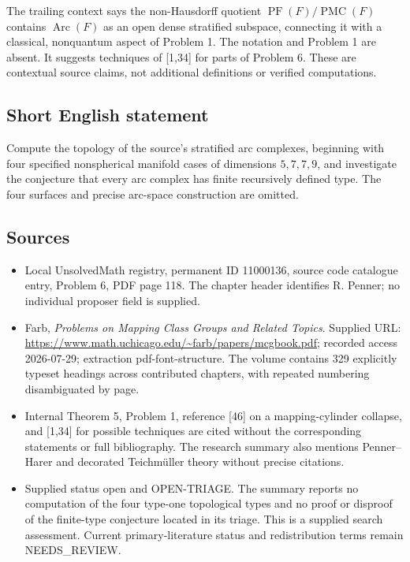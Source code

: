 \documentclass[11pt]{article}
\begin{document}
The trailing context says the non-Hausdorff quotient \(\operatorname{PF}(F)/\operatorname{PMC}(F)\) contains \(\operatorname{Arc}(F)\) as an open dense stratified subspace, connecting it with a classical, nonquantum aspect of Problem 1. The notation and Problem 1 are absent. It suggests techniques of [1,34] for parts of Problem 6. These are contextual source claims, not additional definitions or verified computations.
\subsection{Short English statement}
Compute the topology of the source's stratified arc complexes, beginning with four specified nonspherical manifold cases of dimensions \(5,7,7,9\), and investigate the conjecture that every arc complex has finite recursively defined type. The four surfaces and precise arc-space construction are omitted.
\subsection{Sources}
\begin{itemize}
\item Local UnsolvedMath registry, permanent ID 11000136, source code catalogue entry, Problem 6, PDF page 118. The chapter header identifies R. Penner; no individual proposer field is supplied.
\item Farb, \emph{Problems on Mapping Class Groups and Related Topics}. Supplied URL: \url{https://www.math.uchicago.edu/~farb/papers/mcgbook.pdf}; recorded access 2026-07-29; extraction pdf-font-structure. The volume contains 329 explicitly typeset headings across contributed chapters, with repeated numbering disambiguated by page.
\item Internal Theorem 5, Problem 1, reference [46] on a mapping-cylinder collapse, and [1,34] for possible techniques are cited without the corresponding statements or full bibliography. The research summary also mentions Penner--Harer and decorated Teichm\"uller theory without precise citations.
\item Supplied status open and OPEN-TRIAGE. The summary reports no computation of the four type-one topological types and no proof or disproof of the finite-type conjecture located in its triage. This is a supplied search assessment. Current primary-literature status and redistribution terms remain NEEDS\_REVIEW.
\end{itemize}
\end{document}
